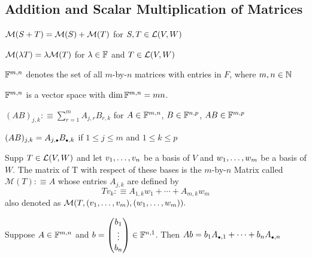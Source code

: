 \subsection{Addition and Scalar Multiplication of Matrices}
\setcounter{thm}{34}
\begin{thm}
    $\mathcal{M}(S+T) = \mathcal{M}(S) + \mathcal{M}(T)$ for $S, T \in \mathcal{L} (V,W)$
\end{thm}

\setcounter{thm}{37}
\begin{thm}
    $\mathcal{M}(\lambda T) = \lambda \mathcal{M}(T)$ for $\lambda \in \mathbb{F}$ and $T \in \mathcal{L} (V,W)$
\end{thm}

\begin{mydef}
    $\mathbb{F}^{m,n}$ denotes the set of all $m$-by-$n$ matrices with entries in $F$, where $m,n \in \mathbb{N}$
\end{mydef}

\begin{thm}
    $\mathbb{F}^{m,n}$ is a vector space with $\dim \mathbb{F}^{m,n}=mn$.
\end{thm}



\setcounter{thm}{40}

\begin{mydef}
    $(AB)_{j,k} :\equiv \sum_{r=1}^{m} A_{j,r} B_{r,k}$ for $A\in \mathbb{F}^{m,n}$, $B\in \mathbb{F}^{n,p}$, $AB \in \mathbb{F}^{m,p}$
\end{mydef}

\setcounter{thm}{45}
\begin{thm}
    $(AB)_{j,k} = A_{j, \mathsmaller{\bullet}} B_{\mathsmaller{\bullet}, k}$ if $1 \leq j \leq m$ and $1 \leq k \leq p$
\end{thm}

\setcounter{thm}{30}
\begin{thm}
    Supp $T \in {\mathcal{L}(V,W)}$ and let $v_1, \dots, v_n$ be a basis of $V$ and $w_1, \dots, w_m$ be a basis of $W$. The matrix of T with respect of these bases is the $m$-by-$n$ Matrix called $\mathcal{M}(T) :\equiv A$ whose entries $A_{j,k}$ are defined by
	\begin{equation}
		Tv_k :\equiv A_{1,k}w_1+\cdots+A_{m,k}w_m
	\end{equation}
	also denoted as $\mathcal{M}(T,(v_1, \dots, v_m), (w_1, \dots, w_m)).$
\end{thm}

\setcounter{thm}{49}
\begin{thm}
    Suppose $A \in \mathbb{F}^{m,n}$ and $b=\left(\begin{matrix}b_1\\ \vdots \\ b_n \end{matrix}\right) \in \mathbb{F}^{n,1}$. Then $Ab = b_1 A_{\mathsmaller{\bullet}, 1} + \dots + b_n A_{\mathsmaller{\bullet},n}$
\end{thm}

